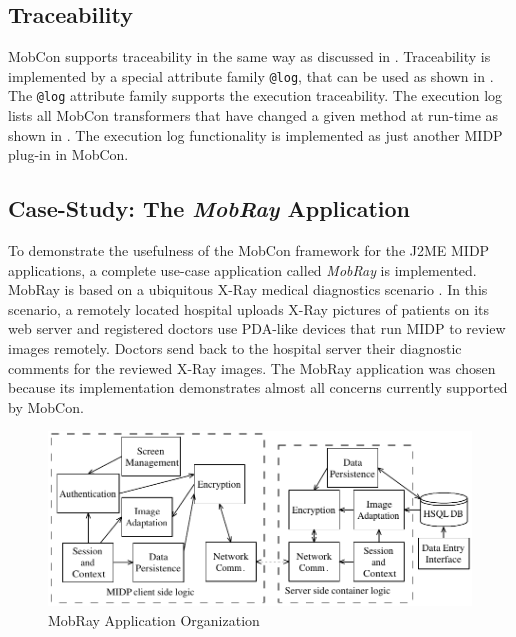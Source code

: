 \subsection{Traceability}
\label{sec.mc.trace}

MobCon supports traceability in the same way as discussed in . Traceability is implemented by a special attribute family \texttt{@log}, that can be used as shown in . The \texttt{@log} attribute family supports the execution traceability. The execution log lists all MobCon transformers that have changed a given method at run-time as shown in . The execution log functionality is implemented as just another MIDP plug-in in MobCon.

\subsection{Case-Study: The \textit{MobRay} Application}
\label{sec.x-ray}

To demonstrate the usefulness of the MobCon framework for the J2ME MIDP applications, a complete use-case application called \textit{MobRay} is implemented. MobRay is based on a ubiquitous X-Ray medical diagnostics scenario \cite{www.xray}. In this scenario, a remotely located hospital uploads X-Ray pictures of patients on its web server and registered doctors use PDA-like devices that run MIDP to review images remotely. Doctors send back to the hospital server their diagnostic comments for the reviewed X-Ray images. The MobRay application was chosen because its implementation demonstrates almost all concerns currently supported by MobCon.

\begin{figure}[ht]
	\begin{center}
		\includegraphics[width=12cm,height=!]{ch05/mobray-struct}
	\end{center}
	\caption{MobRay Application Organization}
	\label{fig:mobray-struct}
\end{figure}

